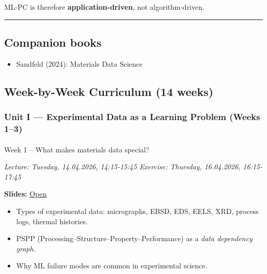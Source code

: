 \documentclass[
]{agujournal2019}
\makeatletter
\let\oldparagraph\paragraph
\renewcommand{\paragraph}{
    \@ifstar
      \xxxParagraphStar
      \xxxParagraphNoStar
  }
\newcommand{\xxxParagraphStar}[1]{\oldparagraph*{#1}\mbox{}}
\newcommand{\xxxParagraphNoStar}[1]{\oldparagraph{#1}\mbox{}}
\providecommand{\tightlist}{%
  \setlength{\itemsep}{0pt}\setlength{\parskip}{0pt}}
\makeatother
\begin{document}
ML-PC is therefore \textbf{application-driven}, not algorithm-driven.

\begin{center}\rule{0.5\linewidth}{0.5pt}\end{center}

\subsection{Companion books}\label{companion-books}

\begin{itemize}
\tightlist
\item
  Sandfeld (2024): Materials Data Science
\end{itemize}

\subsection{Week-by-Week Curriculum (14
weeks)}\label{week-by-week-curriculum-14-weeks}

\subsubsection{Unit I --- Experimental Data as a Learning Problem (Weeks
1--3)}\label{unit-i-experimental-data-as-a-learning-problem-weeks-13}

\paragraph{Week 1 -- What makes materials data
special?}\label{week-1-what-makes-materials-data-special}

\emph{Lecture: Tuesday, 14.04.2026, 14:15-15:45 \textbar{} Exercise:
Thursday, 16.04.2026, 16:15-17:45}

\textbf{Slides:}
\href{https://pelzlab.science/public_presentations/ml_for_characterization_and_processing/unit01_intro/01_intro.html}{Open}

\begin{itemize}
\tightlist
\item
  Types of experimental data: micrographs, EBSD, EDS, EELS, XRD, process
  logs, thermal histories.
\item
  PSPP (Processing--Structure--Property--Performance) as a \emph{data
  dependency graph}.
\item
  Why ML failure modes are common in experimental science.
\end{itemize}
\end{document}
